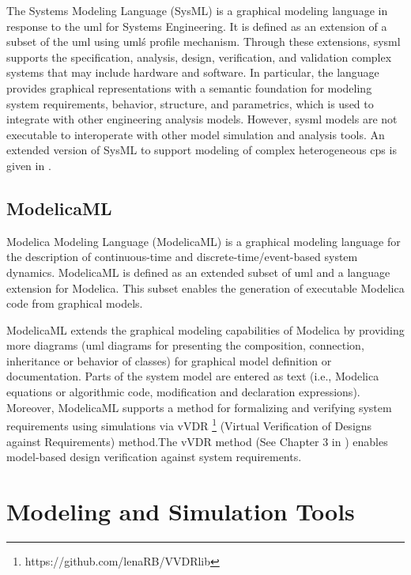 The Systems Modeling Language (SysML) \cite{sysml} is a graphical modeling language in response to the \acrshort{uml} for Systems Engineering. It is defined as an extension of a subset of the \acrshort{uml} using \acrshort{uml}\'s profile mechanism. Through these extensions, \acrshort{sysml} supports the specification, analysis, design, verification, and validation complex systems that may include hardware and software. In particular, the language provides graphical representations with a semantic foundation for modeling system requirements, behavior, structure, and parametrics, which is used to integrate with other engineering analysis models. However, \acrshort{sysml} models are not executable to interoperate with other model simulation and analysis tools. An extended version of SysML to support modeling of complex heterogeneous \acrshort{cps} is given in \cite{mbsdjensen}. 

\subsection{ModelicaML}
\label{sec:modelicaml}

Modelica Modeling Language (ModelicaML) \cite{modelicaml, modelicamlreport} is a graphical modeling language for the description of continuous-time and discrete-time/event-based system dynamics. ModelicaML is defined as an extended subset of \acrshort{uml} and a language extension for Modelica. This subset enables the generation of executable Modelica code from graphical models.

ModelicaML extends the graphical modeling capabilities of Modelica by providing more diagrams (\acrshort{uml} diagrams for presenting the composition, connection, inheritance or behavior of classes) for graphical model definition or documentation.  Parts of the system model are entered as text (i.e., Modelica equations or algorithmic code, modification and declaration expressions). Moreover, ModelicaML supports a method for formalizing and verifying system requirements using simulations via vVDR \footnote{https://github.com/lenaRB/VVDRlib} (Virtual Verification of Designs against Requirements) method.The vVDR method (See Chapter 3 in \cite{modelicamlwladimir, modelicamlverification}) enables model-based design verification against system requirements.


\section{Modeling and Simulation Tools}
\label{sec:tools}

